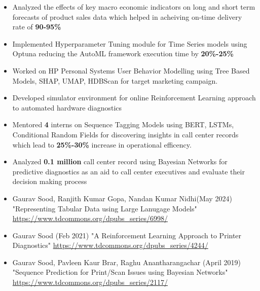 \documentclass[10pt,a4paper,ragged2e,withhyper]{altacv}
\begin{document}
\begin{paracol}{1}
\par\divider
{}

\begin{itemize}
\item Analyzed the effects of key macro economic indicators on long and short
term forecasts of product sales data which helped in acheiving on-time
delivery rate of \textbf{\textbf{90-95\%}}
\item Implemented Hyperparameter Tuning module for Time Series models using Optuna
reducing the AutoML framework execution time by \textbf{\textbf{20\%-25\%}}
\item Worked on HP Personal Systems User Behavior Modelling using Tree Based Models,
SHAP, UMAP, HDBScan for target marketing campaign.
\item Developed simulator environment for online Reinforcement Learning approach to
automated hardware diagnostics
\item Mentored \textbf{\textbf{4}} interns on Sequence Tagging Models using BERT, LSTMs,
Conditional Random Fields for discovering insights in call center records
which lead to \textbf{\textbf{25\%-30\%}} increase in operational efficency.
\item Analyzed \textbf{\textbf{0.1 million}} call center record using Bayesian Networks for predictive
diagnostics as an aid to call center executives and evaluate their decision
making process
\end{itemize}


\newpage

\label{sec:orge653772}
\begin{itemize}
\item Gaurav Sood, Ranjith Kumar Gopa, Nandan Kumar Nidhi(May 2024) "Representing
Tabular Data using Large Lanugage Models"
\url{https://www.tdcommons.org/dpubs\_series/6998/}
\item Gaurav Sood (Feb 2021) "A Reinforcement Learning Approach to Printer Diagnostics"
\url{https://www.tdcommons.org/dpubs\_series/4244/}
\item Gaurav	Sood, Pavleen Kaur Brar, Raghu Anantharangachar (April 2019)
"Sequence Prediction for Print/Scan Issues using Bayesian Networks"
\url{https://www.tdcommons.org/dpubs\_series/2117/}
\end{itemize}


\end{paracol}
\end{document}
